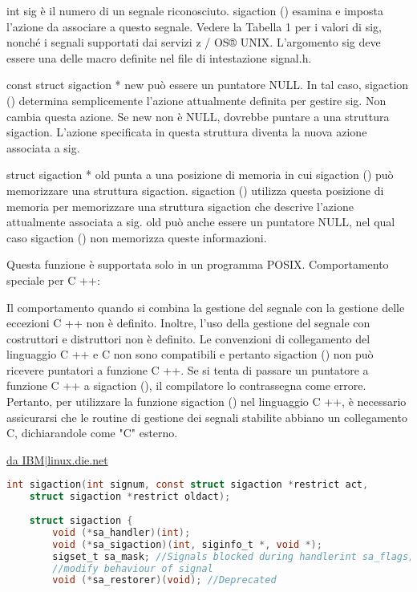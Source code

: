 int sig è il numero di un segnale riconosciuto. sigaction () esamina e imposta l'azione da associare a questo segnale. Vedere la Tabella 1 per i valori di sig, nonché i segnali supportati dai servizi z / OS® UNIX. L'argomento sig deve essere una delle macro definite nel file di intestazione signal.h.

const struct sigaction * new può essere un puntatore NULL. In tal caso, sigaction () determina semplicemente l'azione attualmente definita per gestire sig. Non cambia questa azione. Se new non è NULL, dovrebbe puntare a una struttura sigaction. L'azione specificata in questa struttura diventa la nuova azione associata a sig.

struct sigaction * old punta a una posizione di memoria in cui sigaction () può memorizzare una struttura sigaction. sigaction () utilizza questa posizione di memoria per memorizzare una struttura sigaction che descrive l'azione attualmente associata a sig. old può anche essere un puntatore NULL, nel qual caso sigaction () non memorizza queste informazioni.

Questa funzione è supportata solo in un programma POSIX.
Comportamento speciale per C ++:

    Il comportamento quando si combina la gestione del segnale con la gestione delle eccezioni C ++ non è definito. Inoltre, l'uso della gestione del segnale con costruttori e distruttori non è definito.
    Le convenzioni di collegamento del linguaggio C ++ e C non sono compatibili e pertanto sigaction () non può ricevere puntatori a funzione C ++. Se si tenta di passare un puntatore a funzione C ++ a sigaction (), il compilatore lo contrassegna come errore. Pertanto, per utilizzare la funzione sigaction () nel linguaggio C ++, è necessario assicurarsi che le routine di gestione dei segnali stabilite abbiano un collegamento C, dichiarandole come "C" esterno.

\href{https://www.ibm.com/docs/en/zos/2.4.0?topic=functions-sigaction-examine-change-signal-action}{da IBM}$|$\href{https://linux.die.net/man/2/sigaction}{linux.die.net}

\begin{lstlisting}[language=C]
    int sigaction(int signum, const struct sigaction *restrict act,
    struct sigaction *restrict oldact);
    
    struct sigaction {
        void (*sa_handler)(int);
        void (*sa_sigaction)(int, siginfo_t *, void *);
        sigset_t sa_mask; //Signals blocked during handlerint sa_flags; 
        //modify behaviour of signal
        void (*sa_restorer)(void); //Deprecated
\end{lstlisting}

